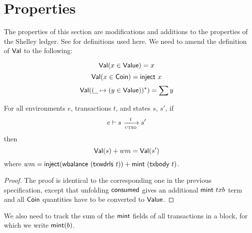 \newcommand{\Val}{\fun{Val}}
\newcommand{\POV}[2]{\ensuremath{\mathsf{PresOfVal}(#1, \mathsf{#2})}}

\section{Properties}
\label{sec:properties}

The properties of this section are modifications and additions to the properties of the Shelley ledger. See \cite{shelley_spec} for definitions used here. We need to amend the definition of $\Val$ to the following:

\begin{equation*}
    \Val(x \in \Value) = x
\end{equation*}
\begin{equation*}
    \Val(x \in \Coin) = \fun{inject}~x
\end{equation*}
\begin{equation*}
    \Val((\wcard\mapsto (y \in \Value))^{*}) = \sum y
\end{equation*}

\begin{lemma}
  \label{lemma:utxo-pres-of-value}
  For all environments $e$, transactions $t$, and states $s$, $s'$, if
  \begin{equation*}
    e\vdash s\trans{utxo}{t}s'
  \end{equation*}
  then
  \begin{equation*}
    \Val(s) + wm = \Val(s')
  \end{equation*}
  where $wm = \mathsf{inject} (\mathsf{wbalance}~(\mathsf{txwdrls}~{t})) + \mathsf{mint}~(\mathsf{txbody}~{t})$.
\end{lemma}
\begin{proof}
  The proof is identical to the corresponding one in the previous
  specification, except that unfolding $\mathsf{consumed}$ gives an
  additional $\mathsf{mint}~{txb}$ term and all $\mathsf{Coin}$ quantities have
  to be converted to $\mathsf{Value}$.
\end{proof}

We also need to track the sum of the $\mathsf{mint}$ fields of all
transactions in a block, for which we write $\mathsf{mint}(b)$.

